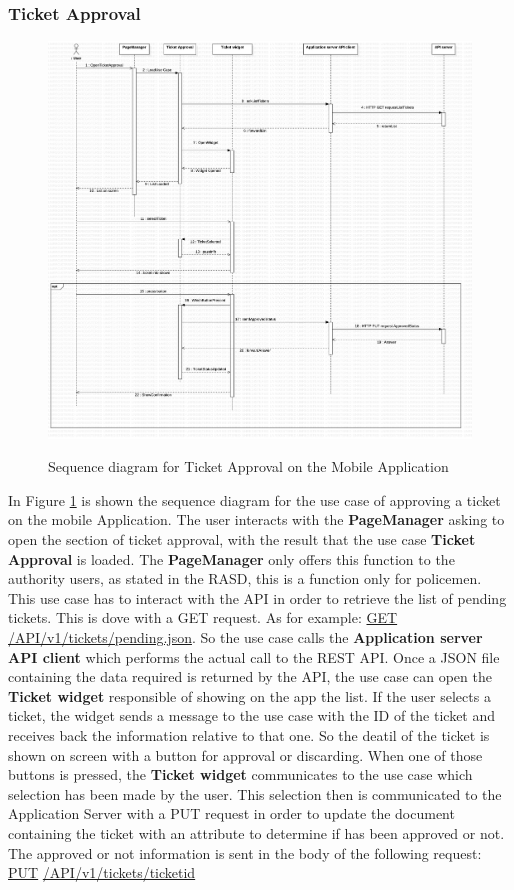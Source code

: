 \subsubsection{Ticket Approval}%
\begin{figure}[H]
\centering
\includegraphics[width=\textwidth]{Images/DDSeqAppTick.png}
\caption{\label{fig:DDSeqAppTick}} Sequence diagram for Ticket Approval on the Mobile Application
\end{figure}
In Figure \ref{fig:DDSeqAppTick} is shown the sequence diagram for the use case of approving a ticket on the mobile Application.
The user interacts with the \textbf{PageManager} asking to open the section of ticket approval, with the result that the use case \textbf{Ticket Approval} is loaded. The \textbf{PageManager} only offers this function to the authority users, as stated in the RASD, this is a function only for policemen. This use case has to interact with the API in order to retrieve the list of pending tickets. This is dove with a GET request. As for example: \url{GET} \url{/API/v1/tickets/pending.json}. So the use case calls the \textbf{Application server API client} which performs the actual call to the REST API. Once a JSON file containing the data required is returned by the API, the use case can open the \textbf{Ticket widget} responsible of showing on the app the list.
If the user selects a ticket, the widget sends a message to the use case with the ID of the ticket and receives back the information relative to that one. So the deatil of the ticket is shown on screen with a button for approval or discarding. When one of those buttons is pressed, the \textbf{Ticket widget} communicates to the use case which selection has been made by the user. This selection then is communicated to the Application Server with a PUT request in order to update the document containing the ticket with an attribute to determine if has been approved or not. The approved or not information is sent in the body of the following request: \url{PUT} \url{/API/v1/tickets/ticketid}


